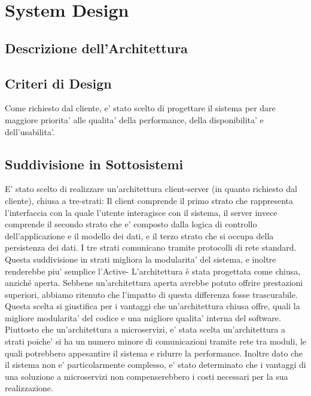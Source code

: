 \chapter{System Design}

\section{Descrizione dell'Architettura}
\section{Criteri di Design}
Come richiesto dal cliente, e' stato scelto di progettare il sistema per dare maggiore priorita' alle qualita' della performance, della disponibilita' e dell'usabilita'.
\section{Suddivisione in Sottosistemi}
E' stato scelto di realizzare un'architettura client-server (in quanto richiesto dal cliente), chiusa a tre-strati:
Il client comprende il primo strato che rappresenta l'interfaccia con la quale l'utente interagisce con il sistema, il server invece comprende il secondo strato che e' composto dalla logica di controllo dell'applicazione e il modello dei dati, e il terzo strato che si occupa della persistenza dei dati. I tre strati comunicano tramite protocolli di rete standard. 
Questa suddivisione in strati migliora la modularita' del sistema, e inoltre renderebbe piu' semplice l'Active- \newline
L'architettura è stata progettata come chiusa, anziché aperta. Sebbene un'architettura aperta avrebbe potuto offrire prestazioni superiori, abbiamo ritenuto che l'impatto di questa differenza fosse trascurabile. Questa scelta si giustifica per i vantaggi che un'architettura chiusa offre, quali la migliore modularita' del codice e una migliore qualita' interna del software. \newline
Piuttosto che un'architettura a microservizi, e' stata scelta un'architettura a strati poiche' si ha un numero minore di comunicazioni tramite rete tra moduli, le quali potrebbero appesantire il sistema e ridurre la performance. Inoltre dato che il sistema non e' particolarmente complesso, e' stato determinato che i vantaggi di una soluzione a microservizi non compenserebbero i costi necessari per la sua realizzazione.
